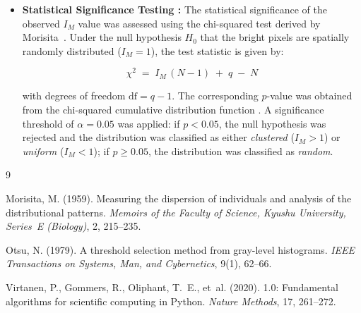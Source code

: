 \begin{itemize}
    \item \textbf{Statistical Significance Testing :} The statistical significance of the observed $I_M$ value was assessed using the
    chi-squared test derived by Morisita~\cite{morisita1959}. Under the null hypothesis
    $H_0$ that the bright pixels are spatially randomly distributed ($I_M = 1$), the
    test statistic is given by:
    
    \begin{equation}
        \chi^2 \;=\; I_M\,(N - 1) \;+\; q \;-\; N
        \label{eq:chi2}
    \end{equation}
    
    \noindent with degrees of freedom $\mathrm{df} = q - 1$. The corresponding
    $p$-value was obtained from the chi-squared cumulative distribution function
    \cite{scipy2020}. A significance threshold of $\alpha = 0.05$ was applied:
    if $p < 0.05$, the null hypothesis was rejected and the distribution was
    classified as either \textit{clustered} ($I_M > 1$) or \textit{uniform}
    ($I_M < 1$); if $p \geq 0.05$, the distribution was classified as \textit{random}.
    
\end{itemize}



\begin{thebibliography}{9}

Morisita, M. (1959).
\newblock Measuring the dispersion of individuals and analysis of the
distributional patterns.
\newblock \textit{Memoirs of the Faculty of Science, Kyushu University,
Series~E (Biology)}, 2, 215--235.

Otsu, N. (1979).
\newblock A threshold selection method from gray-level histograms.
\newblock \textit{IEEE Transactions on Systems, Man, and Cybernetics},
9(1), 62--66.

Virtanen, P., Gommers, R., Oliphant, T.~E., et~al. (2020).
 1.0: Fundamental algorithms for scientific computing in
{Python}.
\newblock \textit{Nature Methods}, 17, 261--272.

\end{thebibliography}



